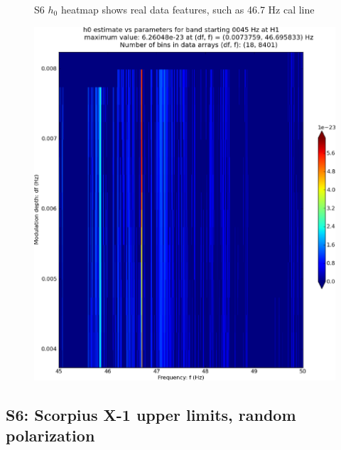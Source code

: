 \begin{figure}
\caption{\protect\includegraphics[width=0.4\paperwidth,height=0.2\paperheight]{plots/DFvsFresultsh0-H1_pulsar-0045.eps}}
S6 $h_0$ heatmap shows real data features, such as 46.7 Hz cal line
\end{figure}

\subsection{S6: Scorpius X-1 upper limits, random polarization}

